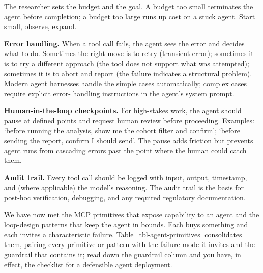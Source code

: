 \documentclass[
  letterpaper,
  11pt]{scrbook}
\begin{document}
The researcher sets the budget and the goal. A budget too small
terminates the agent before completion; a budget too large runs up cost
on a stuck agent. Start small, observe, expand.

\textbf{Error handling.} When a tool call fails, the agent sees the
error and decides what to do. Sometimes the right move is to retry
(transient error); sometimes it is to try a different approach (the tool
does not support what was attempted); sometimes it is to abort and
report (the failure indicates a structural problem). Modern agent
harnesses handle the simple cases automatically; complex cases require
explicit error- handling instructions in the agent's system prompt.

\textbf{Human-in-the-loop checkpoints.} For high-stakes work, the agent
should pause at defined points and request human review before
proceeding. Examples: `before running the analysis, show me the cohort
filter and confirm'; `before sending the report, confirm I should send'.
The pause adds friction but prevents agent runs from cascading errors
past the point where the human could catch them.

\textbf{Audit trail.} Every tool call should be logged with input,
output, timestamp, and (where applicable) the model's reasoning. The
audit trail is the basis for post-hoc verification, debugging, and any
required regulatory documentation.

We have now met the MCP primitives that expose capability to an agent
and the loop-design patterns that keep the agent in bounds. Each buys
something and each invites a characteristic failure.
Table~\ref{tbl-agent-primitives} consolidates them, pairing every
primitive or pattern with the failure mode it invites and the guardrail
that contains it; read down the guardrail column and you have, in
effect, the checklist for a defensible agent deployment.
\end{document}
